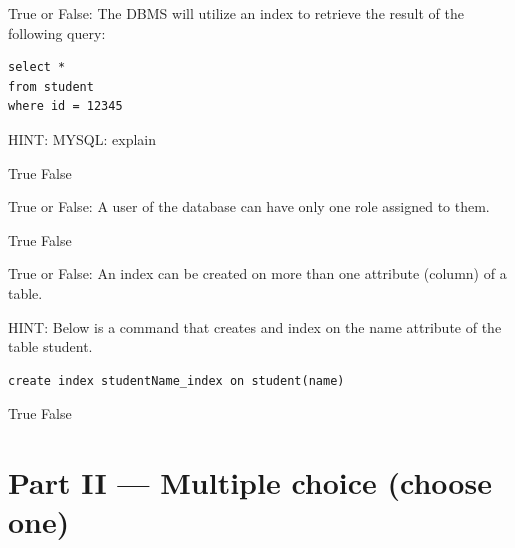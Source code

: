 \documentclass[12pt, addpoints, answers]{exam}
\begin{document}
\begin{questions}
\begin{minipage}{\linewidth}
\question[2]
True or False: The DBMS will utilize an index to retrieve the result of the following query:\par\vspace{0.5em}
\begin{verbatim}
select * 
from student 
where id = 12345
\end{verbatim}
HINT: MYSQL: explain\par\vspace{0.5em}
\begin{checkboxes}
    \choice True
    \CorrectChoice False
\end{checkboxes}
\end{minipage}\vspace{1em}

\begin{minipage}{\linewidth}
\question[2]
True or False: A user of the database can have only one role assigned to them.\par\vspace{0.5em}
\begin{checkboxes}
    \choice True
    \CorrectChoice False
\end{checkboxes}
\end{minipage}\vspace{1em}

\begin{minipage}{\linewidth}
\question[2]
True or False: An index can be created on more than one attribute (column) of a table.\par\vspace{0.5em}
HINT: Below is a command that creates and index on the name attribute of the table student.\par\vspace{0.5em}
\begin{verbatim}
create index studentName_index on student(name)
\end{verbatim}
\begin{checkboxes}
    \CorrectChoice True
    \choice False
\end{checkboxes}
\end{minipage}\vspace{1em}


\section*{Part II — Multiple choice (choose one)}


\end{questions}
\end{document}

